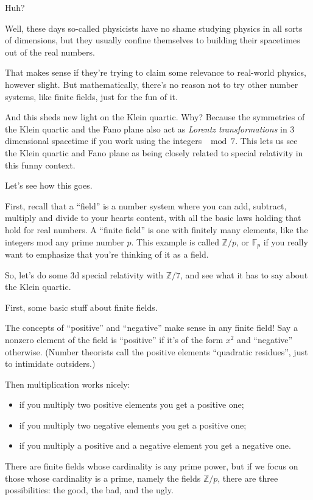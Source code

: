 \documentclass{article}
\def\tightlist{}
\begin{document}
Huh?

Well, these days so-called physicists have no shame studying physics in
all sorts of dimensions, but they usually confine themselves to building
their spacetimes out of the real numbers.

That makes sense if they're trying to claim some relevance to real-world
physics, however slight. But mathematically, there's no reason not to
try other number systems, like finite fields, just for the fun of it.

And this sheds new light on the Klein quartic. Why? Because the
symmetries of the Klein quartic and the Fano plane also act as
\emph{Lorentz transformations} in 3 dimensional spacetime if you work
using the integers \(\mod 7\). This lets us see the Klein quartic and
Fano plane as being closely related to special relativity in this funny
context.

Let's see how this goes.

First, recall that a ``field'' is a number system where you can add,
subtract, multiply and divide to your hearts content, with all the basic
laws holding that hold for real numbers. A ``finite field'' is one with
finitely many elements, like the integers mod any prime number \(p\).
This example is called \(\mathbb{Z}/p\), or \(\mathbb{F}_p\) if you
really want to emphasize that you're thinking of it as a field.

So, let's do some 3d special relativity with \(\mathbb{Z}/7\), and see
what it has to say about the Klein quartic.

First, some basic stuff about finite fields.

The concepts of ``positive'' and ``negative'' make sense in any finite
field! Say a nonzero element of the field is ``positive'' if it's of the
form \(x^2\) and ``negative'' otherwise. (Number theorists call the
positive elements ``quadratic residues'', just to intimidate outsiders.)

Then multiplication works nicely:

\begin{itemize}
\tightlist
\item
  if you multiply two positive elements you get a positive one;
\item
  if you multiply two negative elements you get a positive one;
\item
  if you multiply a positive and a negative element you get a negative
  one.
\end{itemize}

There are finite fields whose cardinality is any prime power, but if we
focus on those whose cardinality is a prime, namely the fields
\(\mathbb{Z}/p\), there are three possibilities: the good, the bad, and
the ugly.
\end{document}
